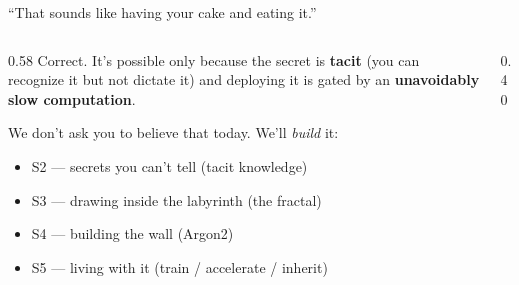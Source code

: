 \documentclass[aspectratio=169,11pt]{beamer}
\begin{document}
\begin{frame}{``That sounds like having your cake and eating it.''}
  \begin{columns}[T]
    \begin{column}{0.58\textwidth}
      Correct. It's possible only because the secret is \textbf{tacit}
      (you can recognize it but not dictate it) and deploying it is gated by an
      \textbf{unavoidably slow computation}.
      \vspace{8pt}

      We don't ask you to believe that today. We'll \emph{build} it:
      \begin{itemize}\small
        \item S2 --- secrets you can't tell (tacit knowledge)
        \item S3 --- drawing inside the labyrinth (the fractal)
        \item S4 --- building the wall (Argon2)
        \item S5 --- living with it (train / accelerate / inherit)
      \end{itemize}
    \end{column}
    \begin{column}{0.40\textwidth}
    \end{column}
  \end{columns}
\end{frame}
\end{document}
